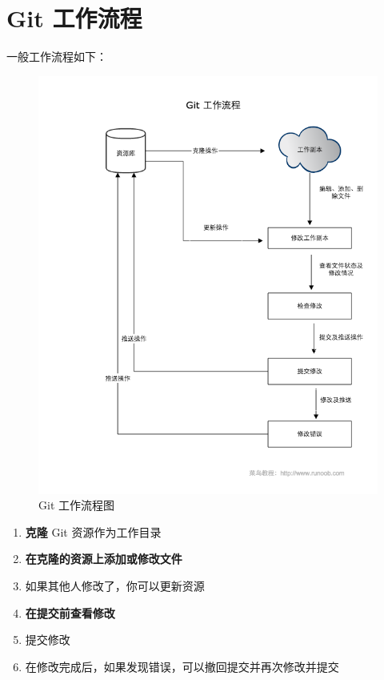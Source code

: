 \documentclass[UTF8,a4paper,12pt]{ctexbook}
\begin{document}
  \chapter{Git 工作流程}
	  一般工作流程如下：
		  \begin{figure}[h]
		  	\centering
		  	\includegraphics[scale = 0.5]{git-process.png}
		  	\caption{Git 工作流程图}
		  \end{figure}
		  
	  \begin{enumerate}
	  	\item \textbf{克隆} Git 资源作为工作目录
	  	\item \textbf{在克隆的资源上添加或修改文件}
	  	\item 如果其他人修改了，你可以更新资源
	  	\item \textbf{在提交前查看修改}
	  	\item 提交修改
	  	\item 在修改完成后，如果发现错误，可以撤回提交并再次修改并提交
	  \end{enumerate}
	  
\end{document}
